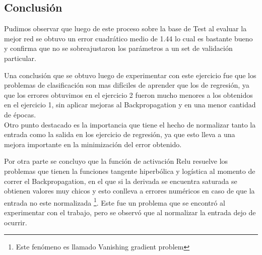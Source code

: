 \subsection{Conclusión}
Pudimos observar que luego de este proceso sobre la base de Test al evaluar la mejor red se obtuvo un error cuadrático medio de 1.44 lo cual es bastante bueno y 
confirma que no se sobreajustaron los parámetros a un set de validación particular.

Una conclusión que se obtuvo luego de experimentar con este ejercicio fue que los problemas de clasificación son mas difíciles de aprender que los de regresión, ya que
los errores obtuvimos en el ejercicio 2 fueron mucho menores a los obtenidos en el ejercicio 1, sin aplicar mejoras al Backpropagation y en una menor cantidad de épocas. \\
Otro punto destacado es la importancia que tiene el hecho de normalizar tanto la entrada como la salida en los ejercicio de regresión, ya que esto lleva a una mejora importante
en la minimización del error obtenido.

Por otra parte se concluyo que la función de activación Relu resuelve los problemas que tienen la funciones tangente hiperbólica y logística al momento de correr el Backpropagation,
en el que si la derivada se encuentra saturada se obtienen valores muy chicos y esto conlleva a errores numéricos en caso de que la entrada no este normalizada \footnote{Este fenómeno es llamado Vanishing gradient problem}. Este fue un problema
que se encontró al experimentar con el trabajo, pero se observó que al normalizar la entrada dejo de ocurrir. 
